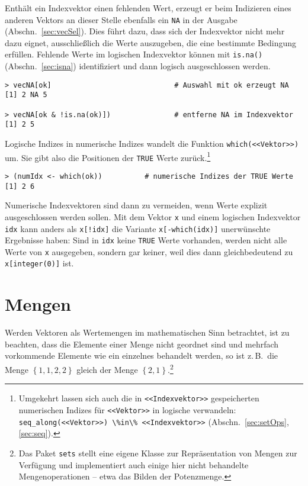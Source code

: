 Enthält ein Indexvektor einen fehlenden Wert, erzeugt er beim Indizieren eines anderen Vektors an dieser Stelle ebenfalls ein \lstinline!NA! in der Ausgabe (Abschn.\ \ref{sec:vecSel}). Dies führt dazu, dass sich der Indexvektor nicht mehr dazu eignet, ausschließlich die Werte auszugeben, die eine bestimmte Bedingung erfüllen. Fehlende Werte im logischen Indexvektor können mit \lstinline!is.na()! (Abschn.\ \ref{sec:isna}) identifiziert und dann logisch ausgeschlossen werden.
\begin{lstlisting}
> vecNA[ok]                             # Auswahl mit ok erzeugt NA
[1] 2 NA 5

> vecNA[ok & !is.na(ok)])               # entferne NA im Indexvektor
[1] 2 5
\end{lstlisting}

Logische Indizes in numerische Indizes wandelt die Funktion \lstinline!which(<<Vektor>>)! um. Sie gibt also die Positionen der \lstinline!TRUE! Werte zurück.\footnote{Umgekehrt lassen sich auch die in \lstinline!<<Indexvektor>>! gespeicherten numerischen Indizes für \lstinline!<<Vektor>>! in logische verwandeln: \lstinline!seq_along(<<Vektor>>) \%in\% <<Indexvektor>>! (Abschn.\ \ref{sec:setOps}, \ref{sec:seq}).}
\begin{lstlisting}
> (numIdx <- which(ok))          # numerische Indizes der TRUE Werte
[1] 2 6
\end{lstlisting}

Numerische Indexvektoren sind dann zu vermeiden, wenn Werte explizit ausgeschlossen werden sollen. Mit dem Vektor \lstinline!x! und einem logischen Indexvektor \lstinline!idx! kann anders als \lstinline|x[!idx]| die Variante \lstinline!x[-which(idx)]! unerwünschte Ergebnisse haben: Sind in \lstinline!idx! keine \lstinline!TRUE! Werte vorhanden, werden nicht alle Werte von \lstinline!x! ausgegeben, sondern gar keiner, weil dies dann gleichbedeutend zu \lstinline!x[integer(0)]! ist.

\section{Mengen}

Werden Vektoren als Wertemengen im mathematischen Sinn betrachtet, ist zu beachten, dass die Elemente einer Menge nicht geordnet sind und mehrfach vorkommende Elemente wie ein einzelnes behandelt werden, so ist z.\,B.\ die Menge $\left\{1, 1, 2, 2\right\}$ gleich der Menge $\left\{2, 1\right\}$.\footnote{Das Paket \lstinline!sets! \cite{Meyer2009a} stellt eine eigene Klasse zur Repräsentation von Mengen zur Verfügung und implementiert auch einige hier nicht behandelte Mengenoperationen -- etwa das Bilden der Potenzmenge.}

